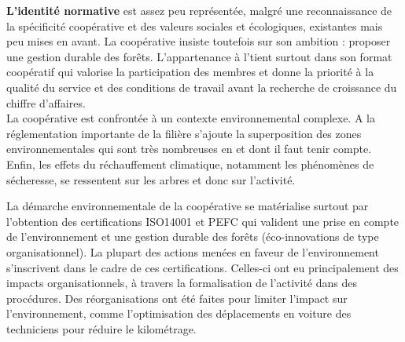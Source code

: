         \textbf{L'identité normative} est assez peu représentée, malgré une reconnaissance de la spécificité coopérative et des valeurs sociales et écologiques, existantes mais peu mises en avant. La coopérative insiste toutefois sur son ambition : proposer une gestion durable des forêts. L'appartenance à l'\ess tient surtout dans son format coopératif qui valorise la participation des membres et donne la priorité à la qualité du service et des conditions de travail avant la recherche de croissance du chiffre d'affaires.\\



        La coopérative est confrontée à un contexte environnemental complexe. A la réglementation importante de la filière s’ajoute la superposition des zones environnementales qui sont très nombreuses en \paca et dont il faut tenir compte.  Enfin, les effets du réchauffement climatique, notamment les phénomènes de sécheresse, se ressentent sur les arbres et donc sur l’activité.

        La démarche environnementale de la coopérative se matérialise surtout par l’obtention des certifications ISO14001 et PEFC qui valident une prise en compte de l’environnement et une gestion durable des forêts (éco-innovations de type organisationnel). La plupart des actions menées en faveur de l’environnement s’inscrivent dans le cadre de ces certifications. Celles-ci ont eu principalement des impacts organisationnels, à travers la formalisation de l’activité dans des procédures. Des réorganisations ont été faites pour limiter l’impact sur l’environnement, comme l’optimisation des déplacements en voiture des techniciens pour réduire le kilométrage.

